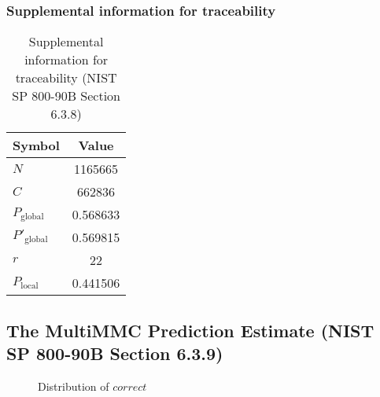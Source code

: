 \documentclass[a3paper,xelatex,english]{bxjsarticle}
\begin{document}
\subsubsection{Supplemental information for traceability}
\renewcommand{\arraystretch}{1.8}
\begin{table}[h]
\caption{Supplemental information for traceability (NIST SP 800-90B Section 6.3.8)}
\begin{center}
\begin{tabular}{|l|c|}
\hline 
\rowcolor{anotherlightblue} %
Symbol				& Value \\ \hline 
$N$				& 1165665\\ \hline 
$C$				& 662836\\ \hline 
$P_{\textrm{global}}$				& 0.568633\\ \hline 
$P'_{\textrm{global}}$			& 0.569815\\ \hline 
$r$				& 22\\ \hline 
$P_{\textrm{local}}$ 			& 0.441506\\ \hline
\end{tabular}
\end{center}
\end{table}
\renewcommand{\arraystretch}{1.4}
\clearpage
\subsection{The MultiMMC Prediction Estimate (NIST SP 800-90B Section 6.3.9)}\label{sec:Binary639}

\begin{figure}[htbp]
\centering

\caption{Distribution of $correct$}
\end{figure}
\end{document}
